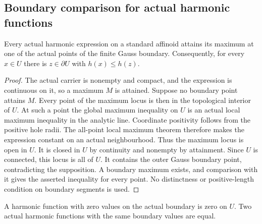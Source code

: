 \subsection{Boundary comparison for actual harmonic functions}\label{subsec:fc-line-harmonic-maximum}

\begin{theorem}\label{thm:fc-harmonic-weak-maximum}
\leanok
{}
Every actual harmonic expression on a standard affinoid attains its maximum
at one of the actual points of the finite Gauss boundary. Consequently, for
every $x\in U$ there is $z\in\partial U$ with $h(x)\le h(z)$.
\end{theorem}

\begin{proof}
The actual carrier is nonempty and compact, and the expression is continuous
on it, so a maximum $M$ is attained. Suppose no boundary point attains $M$.
Every point of the maximum locus is then in the topological interior of $U$.
At such a point the global maximum inequality on $U$ is an actual local
maximum inequality in the analytic line. Coordinate positivity follows from
the positive hole radii. The all-point local maximum theorem therefore makes
the expression constant on an actual neighbourhood. Thus the maximum locus
is open in $U$. It is closed in $U$ by continuity and nonempty by attainment.
Since $U$ is connected, this locus is all of $U$. It contains the outer Gauss
boundary point, contradicting the supposition. A boundary maximum exists,
and comparison with it gives the asserted inequality for every point.
No distinctness or positive-length condition on boundary segments is used.
\end{proof}

\begin{corollary}\label{cor:fc-harmonic-boundary-uniqueness}
\leanok
{}
A harmonic function with zero values on the actual boundary is zero on $U$.
Two actual harmonic functions with the same boundary values are equal.
\end{corollary}


